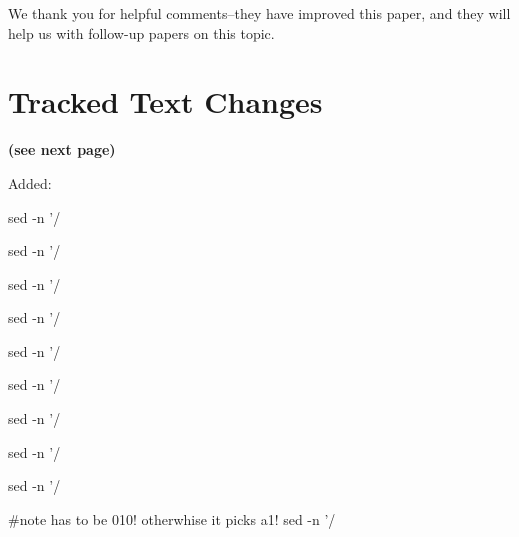We thank you for helpful comments--they have improved this paper, and
they will help us with follow-up papers on this topic.



\section{Tracked Text Changes}  
\textbf{(see next page)}




Added:
\begin{quote}

\end{quote}


sed -n '/%

sed -n '/%

sed -n '/%

sed -n '/%

sed -n '/%

sed -n '/%

sed -n '/%

sed -n '/%

sed -n '/%

#note has to be 010! otherwhise it picks a1!
sed -n '/%















